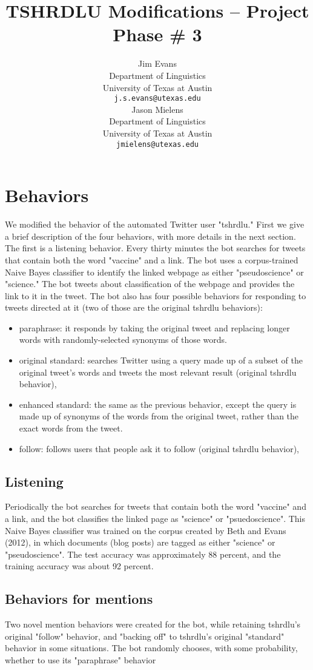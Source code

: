 \documentclass[11pt]{article}
\title{TSHRDLU Modifications -- Project Phase \# 3}
\author{Jim Evans \\
  Department of Linguistics \\
  University of Texas at Austin \\
  {\tt j.s.evans@utexas.edu} \\\And
  Jason Mielens \\
  Department of Linguistics \\
  University of Texas at Austin \\
  {\tt jmielens@utexas.edu} \\}
\date{}
\begin{document}
\maketitle


\section{Behaviors}

We modified the behavior of the automated Twitter user "tshrdlu." First we give a brief description of the four behaviors, with more details in the next section. The first is a listening behavior. Every thirty minutes the bot searches for tweets that contain both the word "vaccine" and a link. The bot uses a corpus-trained Naive Bayes classifier to identify the linked webpage as either "pseudoscience" or "science." The bot tweets about classification of the webpage and provides the link to it in the tweet. The bot also has four possible behaviors for responding to tweets directed at it (two of those are the original tshrdlu behaviors):

\begin{itemize}
\item paraphrase: it responds by taking the original tweet and replacing longer words with randomly-selected synonyms of those words.
\item original standard: searches Twitter using a query made up of a subset of the original tweet's words and tweets the most relevant result (original tshrdlu behavior),
\item enhanced standard: the same as the previous behavior, except the query is made up of synonyms of the words from the original tweet, rather than the exact words from the tweet.
\item follow: follows users that people ask it to follow (original tshrdlu behavior),
\end{itemize}

\subsection{Listening}

Periodically the bot searches for tweets that contain both the word "vaccine" and a link, and the bot classifies the linked page as "science" or "psuedoscience". This Naive Bayes classifier was trained on the corpus created by Beth and Evans (2012), in which documents (blog posts) are tagged as either "science" or "pseudoscience". The test accuracy was approximately 88 percent, and the training accuracy was about 92 percent.

\subsection{Behaviors for mentions}

Two novel mention behaviors were created for the bot, while retaining tshrdlu's original "follow" behavior, and "backing off" to tshrdlu's original "standard" behavior in some situations.
The bot randomly chooses, with some probability, whether to use its "paraphrase" behavior 
\end{document}
